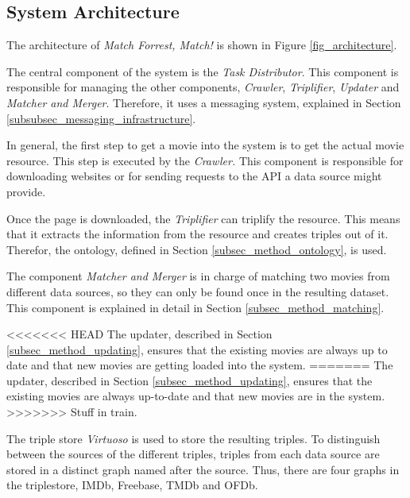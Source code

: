\subsection{System Architecture}
\label{subsec_method_architecture}

The architecture of \emph{Match Forrest, Match!} is shown in Figure \ref{fig_architecture}.

The central component of the system is the \textit{Task Distributor}.
This component is responsible for managing the other components, \textit{Crawler}, \textit{Triplifier}, \textit{Updater} and \textit{Matcher and Merger}.
Therefore, it uses a messaging system, explained in Section \ref{subsubsec_messaging_infrastructure}.

In general, the first step to get a movie into the system is to get the actual movie resource.
This step is executed by the \textit{Crawler.}
This component is responsible for downloading websites or for sending requests to the API a data source might provide.

Once the page is downloaded, the \textit{Triplifier} can triplify the resource.
This means that it extracts the information from the resource and creates triples out of it.
Therefor, the ontology, defined in Section \ref{subsec_method_ontology}, is used.

The component \textit{Matcher and Merger} is in charge of matching two movies from different data sources, so they can only be found once in the resulting dataset.
This component is explained in detail in Section \ref{subsec_method_matching}.

<<<<<<< HEAD
The updater, described in Section \ref{subsec_method_updating}, ensures that the existing movies are always up to date and that new movies are getting loaded into the system.
=======
The updater, described in Section \ref{subsec_method_updating}, ensures that the existing movies are always up-to-date and that new movies are in the system.
>>>>>>> Stuff in train.

The triple store \textit{Virtuoso} is used to store the resulting triples.
To distinguish between the sources of the different triples, triples from each data source are stored in a distinct graph named after the source.
Thus, there are four graphs in the triplestore, IMDb, Freebase, TMDb and OFDb.


